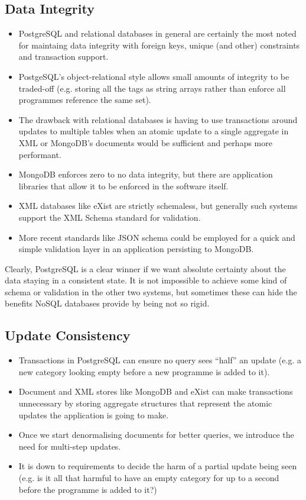 \documentclass[11pt,a4paper]{article}
\begin{document}
\subsection{Data Integrity}

\begin{itemize}
  \item PostgreSQL and relational databases in general are certainly the
    most noted for maintaing data integrity with foreign keys, unique
    (and other) constraints and transaction support.
  \item PostgeSQL's object-relational style allows small amounts of
    integrity to be traded-off (e.g. storing all the tags as string
    arrays rather than enforce all programmes reference the same set).
  \item The drawback with relational databases is having to use transactions
    around updates to multiple tables when an atomic update to a single
    aggregate in XML or MongoDB's documents would be sufficient and perhaps
    more performant.
  \item MongoDB enforces zero to no data integrity, but there are
    application libraries that allow it to be enforced in the software
    itself.
  \item XML databases like eXist are strictly schemaless, but generally
    such systems support the XML Schema standard for validation.
  \item More recent standards like JSON schema could be employed for
    a quick and simple validation layer in an application persisting
    to MongoDB.
\end{itemize}

Clearly, PostgreSQL is a clear winner if we want absolute certainty
about the data staying in a consistent state. It is not impossible
to achieve some kind of schema or validation in the other two systems,
but sometimes these can hide the benefits NoSQL databases provide
by being not so rigid.

\subsection{Update Consistency}

\begin{itemize}
  \item Transactions in PostgreSQL can ensure no query sees
    ``half'' an update (e.g. a new category looking empty
    before a new programme is added to it).
  \item Document and XML stores like MongoDB and eXist can make
    transactions unnecessary by storing aggregate structures
    that represent the atomic updates the application is going to make.
  \item Once we start denormalising documents for better queries,
    we introduce the need for multi-step updates.
  \item It is down to requirements to decide the harm of a partial
    update being seen (e.g. is it all that harmful to have an empty
    category for up to a second before the programme is added to it?)
\end{itemize}
\end{document}
